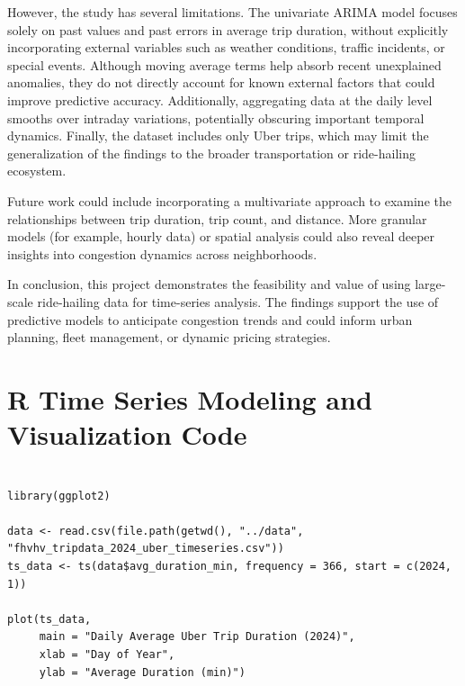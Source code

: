 \documentclass{article}
\begin{document}
However, the study has several limitations. The univariate ARIMA model focuses solely on past values and past errors in average trip duration, without explicitly incorporating external variables such as weather conditions, traffic incidents, or special events. Although moving average terms help absorb recent unexplained anomalies, they do not directly account for known external factors that could improve predictive accuracy. Additionally, aggregating data at the daily level smooths over intraday variations, potentially obscuring important temporal dynamics. Finally, the dataset includes only Uber trips, which may limit the generalization of the findings to the broader transportation or ride-hailing ecosystem.

Future work could include incorporating a multivariate approach to examine the relationships between trip duration, trip count, and distance. More granular models (for example, hourly data) or spatial analysis could also reveal deeper insights into congestion dynamics across neighborhoods.

In conclusion, this project demonstrates the feasibility and value of using large-scale ride-hailing data for time-series analysis. The findings support the use of predictive models to anticipate congestion trends and could inform urban planning, fleet management, or dynamic pricing strategies.


\appendix

\section{R Time Series Modeling and Visualization Code}
\label{appendix:rcode}
\begin{lstlisting}[style=rstyle, caption={Loading and Plotting Time Series}, label={lst:r_ts_plot}]

library(ggplot2)

data <- read.csv(file.path(getwd(), "../data", "fhvhv_tripdata_2024_uber_timeseries.csv"))
ts_data <- ts(data$avg_duration_min, frequency = 366, start = c(2024, 1))

plot(ts_data,
     main = "Daily Average Uber Trip Duration (2024)",
     xlab = "Day of Year",
     ylab = "Average Duration (min)")
\end{lstlisting}
\end{document}
